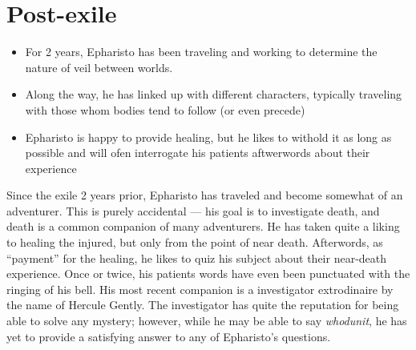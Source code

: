 \documentclass[10pt,twoside,twocolumn,openany]{book}
\begin{document}
\section{Post-exile}
\begin{itemize}
  \item For 2 years, Epharisto has been traveling and working to determine the nature of veil between worlds.
  \item Along the way, he has linked up with different characters, typically traveling with those whom bodies tend to follow (or even precede)
  \item Epharisto is happy to provide healing, but he likes to withold it as long as possible and will ofen interrogate his patients aftwerwords about their experience
\end{itemize}
Since the exile 2 years prior, Epharisto has traveled and become somewhat of an adventurer.
This is purely accidental --- his goal is to investigate death, and death is a common companion of many adventurers.
He has taken quite a liking to healing the injured, but only from the point of near death.
Afterwords, as ``payment'' for the healing, he likes to quiz his subject about their near-death experience.
Once or twice, his patients words have even been punctuated with the ringing of his bell.
His most recent companion is a investigator extrodinaire by the name of Hercule Gently.
The investigator has quite the reputation for being able to solve any mystery; however, while he may be able to say \emph{whodunit}, he has yet to provide a satisfying answer to any of Epharisto's questions.\\
\end{document}
